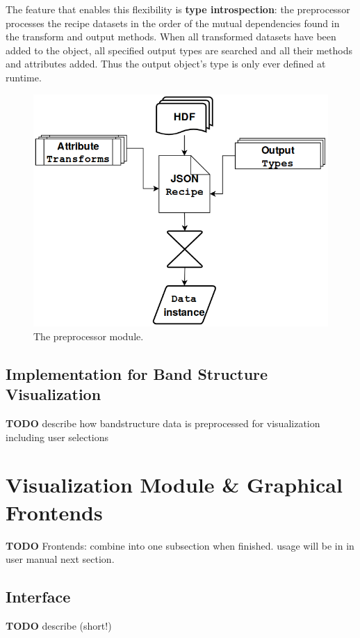 The feature that enables this flexibility is \textbf{type introspection}: the
preprocessor processes the recipe datasets in the order of the mutual
dependencies found in the transform and output methods. When all transformed
datasets have been added to the object, all specified output types are searched
and all their methods and attributes added. Thus the output object's type is
only ever defined at runtime.  

\begin{figure}[htb!]
    \centering
    \includegraphics[width=0.6\linewidth]{img/reader_flowchart4.png}
    \caption{The preprocessor module.}
    \label{fig:preprocessor}
\end{figure}

\subsection{Implementation for Band Structure Visualization}
\label{sec:preprocessor-implementation}

\textbf{TODO} describe how bandstructure data is preprocessed for visualization
including user selections

\section{Visualization Module \& Graphical Frontends}
\label{sec:visualization-module}

\textbf{TODO} Frontends: combine into one subsection when finished. usage will
be in in user manual next section.

\subsection{Interface}
\label{sec:visualization-interface}

\textbf{TODO} describe (short!)

